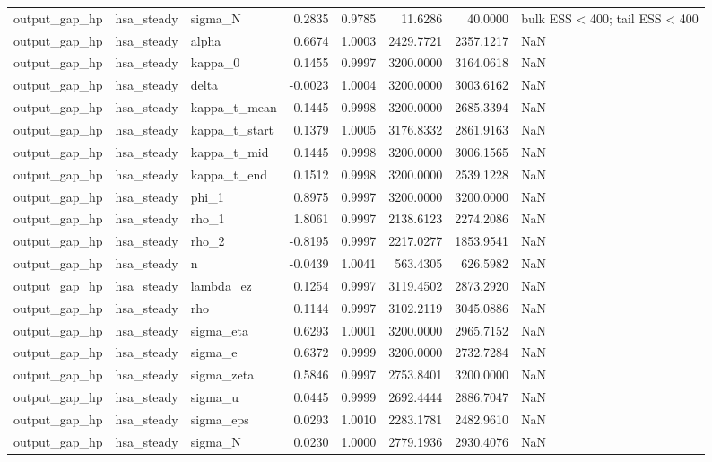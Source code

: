 \begin{tabular}{lllrrrrl}
output\_gap\_hp & hsa\_steady & sigma\_N & 0.2835 & 0.9785 & 11.6286 & 40.0000 & bulk ESS < 400; tail ESS < 400 \\
output\_gap\_hp & hsa\_steady & alpha & 0.6674 & 1.0003 & 2429.7721 & 2357.1217 & NaN \\
output\_gap\_hp & hsa\_steady & kappa\_0 & 0.1455 & 0.9997 & 3200.0000 & 3164.0618 & NaN \\
output\_gap\_hp & hsa\_steady & delta & -0.0023 & 1.0004 & 3200.0000 & 3003.6162 & NaN \\
output\_gap\_hp & hsa\_steady & kappa\_t\_mean & 0.1445 & 0.9998 & 3200.0000 & 2685.3394 & NaN \\
output\_gap\_hp & hsa\_steady & kappa\_t\_start & 0.1379 & 1.0005 & 3176.8332 & 2861.9163 & NaN \\
output\_gap\_hp & hsa\_steady & kappa\_t\_mid & 0.1445 & 0.9998 & 3200.0000 & 3006.1565 & NaN \\
output\_gap\_hp & hsa\_steady & kappa\_t\_end & 0.1512 & 0.9998 & 3200.0000 & 2539.1228 & NaN \\
output\_gap\_hp & hsa\_steady & phi\_1 & 0.8975 & 0.9997 & 3200.0000 & 3200.0000 & NaN \\
output\_gap\_hp & hsa\_steady & rho\_1 & 1.8061 & 0.9997 & 2138.6123 & 2274.2086 & NaN \\
output\_gap\_hp & hsa\_steady & rho\_2 & -0.8195 & 0.9997 & 2217.0277 & 1853.9541 & NaN \\
output\_gap\_hp & hsa\_steady & n & -0.0439 & 1.0041 & 563.4305 & 626.5982 & NaN \\
output\_gap\_hp & hsa\_steady & lambda\_ez & 0.1254 & 0.9997 & 3119.4502 & 2873.2920 & NaN \\
output\_gap\_hp & hsa\_steady & rho & 0.1144 & 0.9997 & 3102.2119 & 3045.0886 & NaN \\
output\_gap\_hp & hsa\_steady & sigma\_eta & 0.6293 & 1.0001 & 3200.0000 & 2965.7152 & NaN \\
output\_gap\_hp & hsa\_steady & sigma\_e & 0.6372 & 0.9999 & 3200.0000 & 2732.7284 & NaN \\
output\_gap\_hp & hsa\_steady & sigma\_zeta & 0.5846 & 0.9997 & 2753.8401 & 3200.0000 & NaN \\
output\_gap\_hp & hsa\_steady & sigma\_u & 0.0445 & 0.9999 & 2692.4444 & 2886.7047 & NaN \\
output\_gap\_hp & hsa\_steady & sigma\_eps & 0.0293 & 1.0010 & 2283.1781 & 2482.9610 & NaN \\
output\_gap\_hp & hsa\_steady & sigma\_N & 0.0230 & 1.0000 & 2779.1936 & 2930.4076 & NaN \\

\end{tabular}
